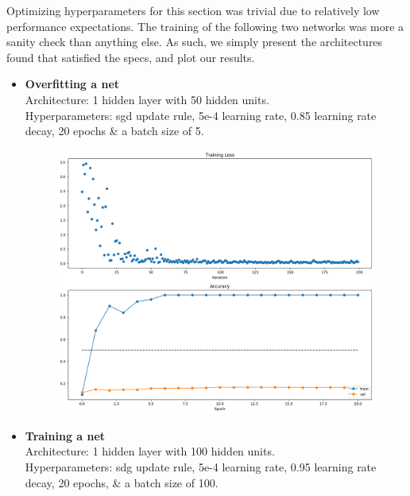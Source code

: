 Optimizing hyperparameters for this section was trivial due to relatively low performance expectations.
The training of the following two networks was more a sanity check than anything else.
As such, we simply present the architectures found that satisfied the specs, and plot our results.
\begin{itemize}[topsep=-13pt]
  
  \item \textbf{Overfitting a net}\\
    Architecture: 1 hidden layer with 50 hidden units.\\
    Hyperparameters: sgd update rule, 5e-4 learning rate, 0.85 learning rate decay, 20 epochs \&  a batch size of 5.
    

    \begin{figure}[!ht]
        \centering
        {{\includegraphics[scale = 0.32]{../nets/overfit_net/diagrams.png}}}  
    \end{figure}

  \item \textbf{Training a net}\\
    Architecture: 1 hidden layer with 100 hidden units.\\
    Hyperparameters: sdg update rule, 5e-4 learning rate, 0.95 learning rate decay, 20 epochs, \& a batch size of 100.
    
    

\end{itemize}
